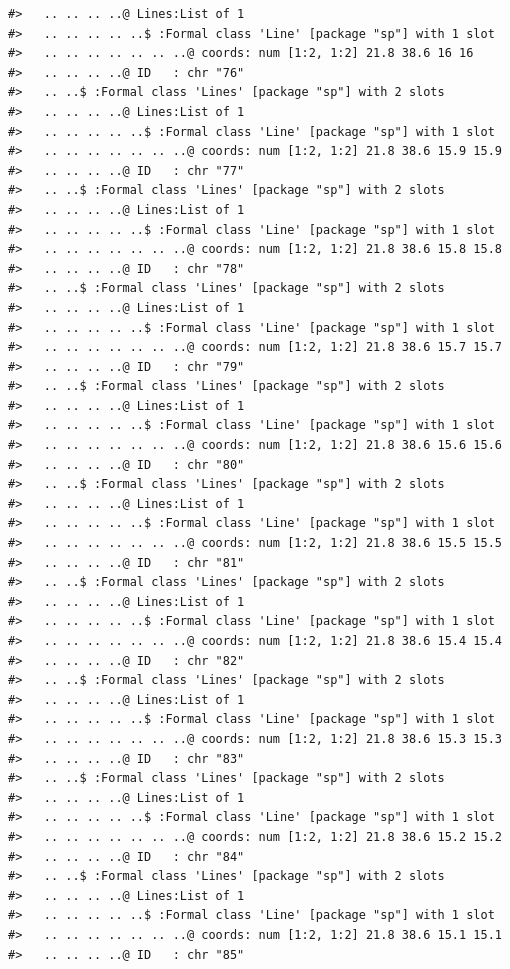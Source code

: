\documentclass[12pt,a4paper,a4paper]{book}
\theoremstyle{definition}
\theoremstyle{definition}
\theoremstyle{definition}
\theoremstyle{remark}
\begin{document}
\begin{verbatim}
#>   .. .. .. ..@ Lines:List of 1
#>   .. .. .. .. ..$ :Formal class 'Line' [package "sp"] with 1 slot
#>   .. .. .. .. .. .. ..@ coords: num [1:2, 1:2] 21.8 38.6 16 16
#>   .. .. .. ..@ ID   : chr "76"
#>   .. ..$ :Formal class 'Lines' [package "sp"] with 2 slots
#>   .. .. .. ..@ Lines:List of 1
#>   .. .. .. .. ..$ :Formal class 'Line' [package "sp"] with 1 slot
#>   .. .. .. .. .. .. ..@ coords: num [1:2, 1:2] 21.8 38.6 15.9 15.9
#>   .. .. .. ..@ ID   : chr "77"
#>   .. ..$ :Formal class 'Lines' [package "sp"] with 2 slots
#>   .. .. .. ..@ Lines:List of 1
#>   .. .. .. .. ..$ :Formal class 'Line' [package "sp"] with 1 slot
#>   .. .. .. .. .. .. ..@ coords: num [1:2, 1:2] 21.8 38.6 15.8 15.8
#>   .. .. .. ..@ ID   : chr "78"
#>   .. ..$ :Formal class 'Lines' [package "sp"] with 2 slots
#>   .. .. .. ..@ Lines:List of 1
#>   .. .. .. .. ..$ :Formal class 'Line' [package "sp"] with 1 slot
#>   .. .. .. .. .. .. ..@ coords: num [1:2, 1:2] 21.8 38.6 15.7 15.7
#>   .. .. .. ..@ ID   : chr "79"
#>   .. ..$ :Formal class 'Lines' [package "sp"] with 2 slots
#>   .. .. .. ..@ Lines:List of 1
#>   .. .. .. .. ..$ :Formal class 'Line' [package "sp"] with 1 slot
#>   .. .. .. .. .. .. ..@ coords: num [1:2, 1:2] 21.8 38.6 15.6 15.6
#>   .. .. .. ..@ ID   : chr "80"
#>   .. ..$ :Formal class 'Lines' [package "sp"] with 2 slots
#>   .. .. .. ..@ Lines:List of 1
#>   .. .. .. .. ..$ :Formal class 'Line' [package "sp"] with 1 slot
#>   .. .. .. .. .. .. ..@ coords: num [1:2, 1:2] 21.8 38.6 15.5 15.5
#>   .. .. .. ..@ ID   : chr "81"
#>   .. ..$ :Formal class 'Lines' [package "sp"] with 2 slots
#>   .. .. .. ..@ Lines:List of 1
#>   .. .. .. .. ..$ :Formal class 'Line' [package "sp"] with 1 slot
#>   .. .. .. .. .. .. ..@ coords: num [1:2, 1:2] 21.8 38.6 15.4 15.4
#>   .. .. .. ..@ ID   : chr "82"
#>   .. ..$ :Formal class 'Lines' [package "sp"] with 2 slots
#>   .. .. .. ..@ Lines:List of 1
#>   .. .. .. .. ..$ :Formal class 'Line' [package "sp"] with 1 slot
#>   .. .. .. .. .. .. ..@ coords: num [1:2, 1:2] 21.8 38.6 15.3 15.3
#>   .. .. .. ..@ ID   : chr "83"
#>   .. ..$ :Formal class 'Lines' [package "sp"] with 2 slots
#>   .. .. .. ..@ Lines:List of 1
#>   .. .. .. .. ..$ :Formal class 'Line' [package "sp"] with 1 slot
#>   .. .. .. .. .. .. ..@ coords: num [1:2, 1:2] 21.8 38.6 15.2 15.2
#>   .. .. .. ..@ ID   : chr "84"
#>   .. ..$ :Formal class 'Lines' [package "sp"] with 2 slots
#>   .. .. .. ..@ Lines:List of 1
#>   .. .. .. .. ..$ :Formal class 'Line' [package "sp"] with 1 slot
#>   .. .. .. .. .. .. ..@ coords: num [1:2, 1:2] 21.8 38.6 15.1 15.1
#>   .. .. .. ..@ ID   : chr "85"

\end{verbatim}
\end{document}
